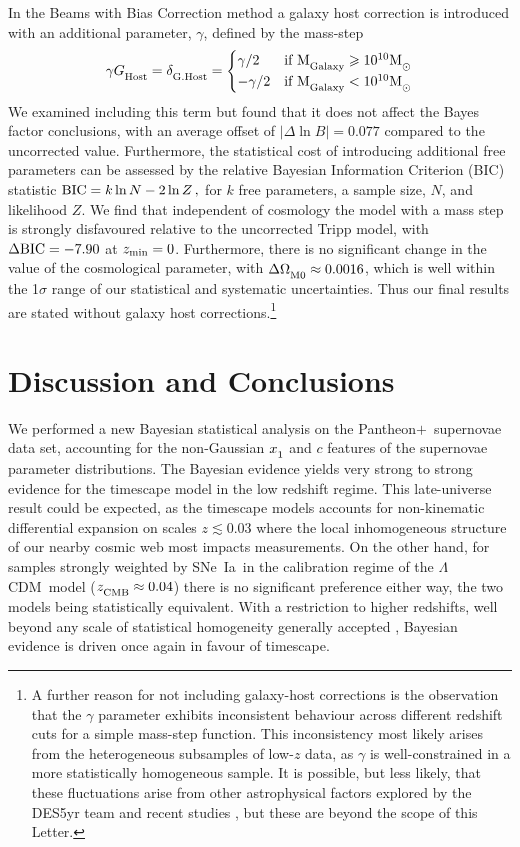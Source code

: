 \documentclass[fleqn,usenatbib]{mnras}
\newcommand{\pplus}{Pantheon$+$}
\newcommand{\LA}{\Lambda}
\newcommand{\LCDM}{$\LA$CDM}
\newcommand{\sne}{SNe~Ia}
\newcommand{\Z}[1]{_{\lower2pt\hbox{$\scriptstyle#1$}}}
\newcommand{\Ns}[1]{_{\lower2pt\hbox{$\scriptstyle\rm#1$}}}
\newcommand{\lsim}{\lesssim}
\newcommand{\ns}[1]{_{\rm #1}}
\newcommand{\zmin}{z\ns{min}}
\begin{document}
In the Beams with Bias Correction method \citep{Kessler_2017} a galaxy host correction is introduced with an additional parameter, $\gamma$, defined by the mass-step
\begin{equation}
\gamma G\Ns{Host} = \delta\Ns{G. Host} = 
    \begin{cases}
        \gamma/2 & \text{if } {\rm M}\Ns{Galaxy} \geq 10^{10} {\rm M}\Z{\odot}\\
        -\gamma/2 & \text{if } {\rm M}\Ns{Galaxy} < 10^{10} {\rm M}\Z{\odot}
    \end{cases}
\end{equation}
We examined including this term but found that it does not affect the Bayes factor conclusions, with an average
offset of $| \Delta \ln B | = 0.077$ compared to the uncorrected value. Furthermore, the statistical cost of introducing additional free parameters can be assessed by the relative Bayesian Information Criterion (BIC) statistic \citep{Schwarz_1978, Kass_1995} ${\rm BIC} = k\ln N - 2 \ln Z\,, $ for $k$ free parameters, a sample size, $N$, and likelihood $Z$. We find that independent of cosmology the model with a mass step is strongly disfavoured relative to the uncorrected Tripp model, with $\Delta {\rm BIC} = -7.90$ at $\zmin = 0$. Furthermore, there is no significant change in the value of the cosmological parameter, with $\Delta \Omega\Ns{M0} \approx 0.0016$, which is well within the 1$\sigma$ range of our statistical and systematic uncertainties. Thus our final results are stated without galaxy host corrections.\footnote{A further reason for not including galaxy-host corrections is the observation that the $\gamma$ parameter exhibits inconsistent behaviour across different redshift cuts for a simple mass-step function. This inconsistency most likely arises from the heterogeneous subsamples of low-$z$ data, as $\gamma$ is well-constrained in a more statistically homogeneous sample. It is possible, but less likely, that these fluctuations arise from other astrophysical factors explored by the DES5yr team and recent studies \citep{Dixon_2024}, but these are beyond the scope of this Letter.}

\section{Discussion and Conclusions}
We performed a new Bayesian statistical analysis on the \pplus\ supernovae data set, accounting for the non-Gaussian $x\Z 1$ and $c$ features of the supernovae parameter distributions. The Bayesian evidence yields very strong to strong evidence for the timescape model in the low redshift regime. This late-universe result could be expected, as the timescape models accounts for non-kinematic differential expansion on scales $z\lsim0.03$ where the local inhomogeneous structure of our nearby cosmic web most impacts measurements.
On the other hand, for samples strongly weighted by \sne\ in the calibration regime of the \LCDM\ model ($z\Ns{CMB}\approx0.04$) there is no significant preference either way, the two models being statistically equivalent. With a restriction to higher redshifts, well beyond any scale of statistical homogeneity generally accepted \citep{Lane_2023}, Bayesian evidence is driven once again in favour of timescape.
\end{document}
